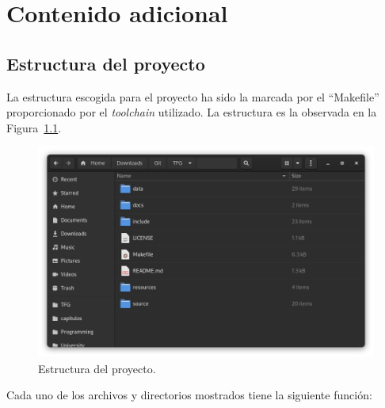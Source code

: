 
\chapter{Contenido adicional}\label{sec:apendice}

\section{Estructura del proyecto}\label{ap:estructura}
La estructura escogida para el proyecto ha sido la marcada por el ``Makefile'' proporcionado por el \textit{toolchain} utilizado. La estructura es la observada en la Figura~\ref{fig:ap_estructura}.

\begin{figure}[h]
	\centering
	\includegraphics[width=.7\textwidth]{capitulos/apendice/estructura.png}
	\caption{Estructura del proyecto.}\label{fig:ap_estructura}
\end{figure}
\FloatBarrier{}

Cada uno de los archivos y directorios mostrados tiene la siguiente función:

